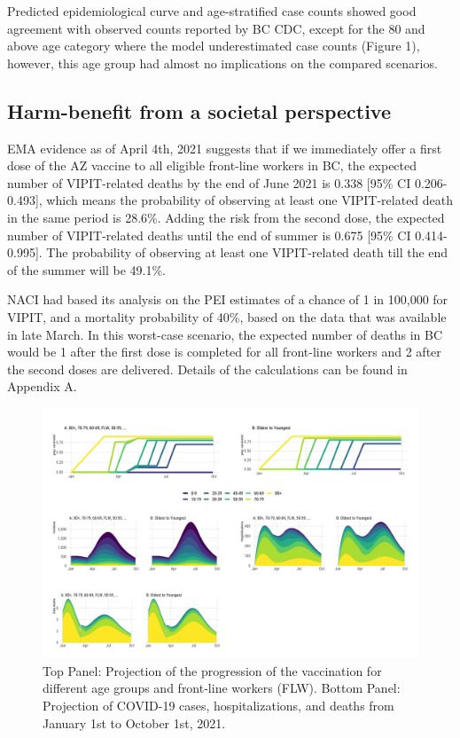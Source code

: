 \documentclass[]{elsarticle} %
\begin{document}
Predicted epidemiological curve and age-stratified case counts showed
good agreement with observed counts reported by BC CDC, except for the
80 and above age category where the model underestimated case counts
(Figure 1), however, this age group had almost no implications on the
compared scenarios.

\hypertarget{harm-benefit-from-a-societal-perspective}{%
\subsection{Harm-benefit from a societal
perspective}\label{harm-benefit-from-a-societal-perspective}}

EMA evidence as of April 4th, 2021 suggests that if we immediately offer
a first dose of the AZ vaccine to all eligible front-line workers in BC,
the expected number of VIPIT-related deaths by the end of June 2021 is
0.338 {[}95\% CI 0.206-0.493{]}, which means the probability of
observing at least one VIPIT-related death in the same period is 28.6\%.
Adding the risk from the second dose, the expected number of
VIPIT-related deaths until the end of summer is 0.675 {[}95\% CI
0.414-0.995{]}. The probability of observing at least one VIPIT-related
death till the end of the summer will be 49.1\%.

NACI had based its analysis on the PEI estimates of a chance of 1 in
100,000 for VIPIT, and a mortality probability of 40\%, based on the
data that was available in late March. In this worst-case scenario, the
expected number of deaths in BC would be 1 after the first dose is
completed for all front-line workers and 2 after the second doses are
delivered. Details of the calculations can be found in Appendix A.

\begin{figure}

{\centering \includegraphics[width=1\linewidth]{../figures/fig-trajectoriesFull} 

}

\caption{Top Panel: Projection of the progression of the vaccination for different age groups and front-line workers (FLW). Bottom Panel: Projection of COVID-19 cases, hospitalizations, and deaths from January 1st to October 1st, 2021.}\label{fig:fig1}
\end{figure}
\end{document}
